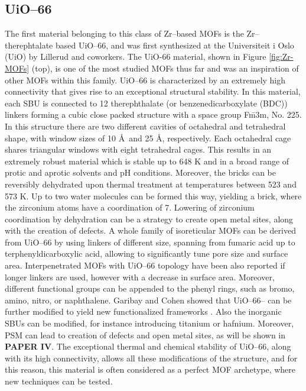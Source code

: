 \subsection*{UiO--66}
The first material belonging to this class of Zr--based MOFs is the Zr--therephtalate based UiO--66, and was first synthesized at the Universiteit i Oslo (UiO) by Lillerud and coworkers\cite{cavka2008new}. The UiO-66 material, shown in Figure \ref{fig:Zr-MOFs} (top), is one of the most studied MOFs thus far and was an inspiration of other MOFs within this family. UiO--66 is characterized by an extremely high connectivity that gives rise to an exceptional structural stability. In this material, each  SBU is connected to 12 therephthalate (or benzenedicarboxylate (BDC)) linkers forming a cubic close packed structure with a space group F\={m}3m, No. 225. In this structure there are two different cavities of octahedral and tetrahedral shape, with window sizes of 10 \AA\ and 25 \AA, respectively. Each octahedral cage shares triangular windows with eight tetrahedral cages. 
This results in an extremely robust material which is stable up to 648 K and in a broad range of protic and aprotic solvents and pH conditions. Moreover, the  bricks can be reversibly dehydrated upon thermal treatment at temperatures between 523 and 573 K. Up to two water molecules can be formed this way, yielding a  brick, where the zirconium atoms have a coordination of 7\cite{valenzano2011disclosing}. Lowering of zirconium coordination by dehydration can be a strategy to create open metal sites, along with the creation of defects.
\npar
A whole family of isoreticular MOFs can be derived from UiO--66 by using linkers of different size, spanning from fumaric acid\cite{wissmann2012modulated} up to terphenyldicarboxylic acid\cite{schaate2011modulated}, allowing to significantly tune pore size and surface area. Interpenetrated MOFs with UiO--66 topology have been also reported if longer linkers are used\cite{schaate2011porous}, however with a decrease in surface area. Moreover, different functional groups can be appended to the phenyl rings, such as bromo, amino, nitro, or naphthalene. Garibay and Cohen showed that UiO--66-- can be further modified to yield new functionalized frameworks \cite{garibay2010isoreticular}. Also the inorganic SBUs can be modified, for instance introducing titanium or hafnium\cite{kim2012postsynthetic}. Moreover, PSM can lead to creation of defects and open metal sites, as will be shown in \textbf{PAPER IV}. The exceptional thermal and chemical stability of UiO--66, along with its high connectivity, allows all these modifications of the structure, and for this reason, this material is often considered as a perfect MOF archetype, where new techniques can be tested. 

